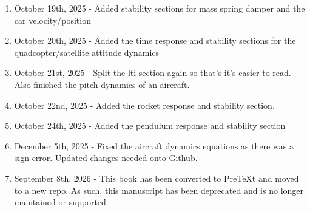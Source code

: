\documentclass{article}
\begin{document}
\begin{enumerate}[itemsep=-5pt]
\item October 19th, 2025 - Added stability sections for mass spring damper and the car velocity/position
\item October 20th, 2025 - Added the time response and stability sections for the quadcopter/satellite attitude dynamics
\item October 21st, 2025 - Split the lti section again so that's it's easier to read. Also finished the pitch dynamics of an aircraft.
\item October 22nd, 2025 - Added the rocket response and stability section.
\item October 24th, 2025 - Added the pendulum response and stability section
\item December 5th, 2025 - Fixed the aircraft dynamics equations as there was a sign error. Updated changes needed onto Github.
\item September 8th, 2026 - This book has been converted to PreTeXt and moved to a new repo. As such, this manuscript has been deprecated and is no longer maintained or supported. 
\end{enumerate}
\end{document}
